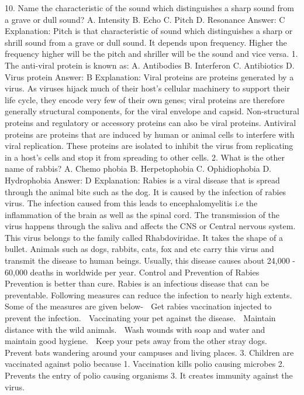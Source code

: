 10. Name the characteristic of the sound which distinguishes a
sharp sound from a grave or dull sound?
A. Intensity
B. Echo
C. Pitch
D. Resonance
Answer: C
Explanation: Pitch is that characteristic of sound which
distinguishes a sharp or shrill sound from a grave or dull sound. It
depends upon frequency. Higher the frequency higher will be the
pitch and shriller will be the sound and vice versa.
1. The anti-viral protein is known as:
A. Antibodies
B. Interferon
C. Antibiotics
D. Virus protein
Answer: B
Explanation: Viral proteins are proteins generated by a virus. As
viruses hijack much of their host's cellular machinery to support
their life cycle, they encode very few of their own genes; viral
proteins are therefore generally structural components, for the
viral envelope and capsid. Non-structural proteins and regulatory or
accessory proteins can also be viral proteins.
Antiviral proteins are proteins that are induced by human or animal
cells to interfere with viral replication. These proteins are isolated
to inhibit the virus from replicating in a host's cells and stop it from
spreading to other cells.
2. What is the other name of rabbis?
A. Chemo phobia
B. Herpetophobia
C. Ophidiophobia
D. Hydrophobia
Answer: D
Explanation: Rabies is a viral disease that is spread through the
animal bite such as the dog. It is caused by the infection of rabies
virus. The infection caused from this leads to encephalomyelitis i.e
the inflammation of the brain as well as the spinal cord. The
transmission of the virus happens through the saliva and affects the
CNS or Central nervous system. This virus belongs to the family
called Rhabdoviridae. It takes the shape of a bullet.
Animals such as dogs, rabbits, cats, fox and etc carry this virus and
transmit the disease to human beings. Usually, this disease causes
about 24,000 - 60,000 deaths in worldwide per year.
Control and Prevention of Rabies
Prevention is better than cure. Rabies is an infectious disease that
can be preventable. Following measures can reduce the infection to
nearly high extents. Some of the measures are given below-
 Get rabies vaccination injected to prevent the infection.
 Vaccinating your pet against the disease.
 Maintain distance with the wild animals.
 Wash wounds with soap and water and maintain good hygiene.
 Keep your pets away from the other stray dogs.
 Prevent bats wandering around your campuses and living places.
3. Children are vaccinated against polio because
1. Vaccination kills polio causing microbes
2. Prevents the entry of polio causing organisms
3. It creates immunity against the virus.
